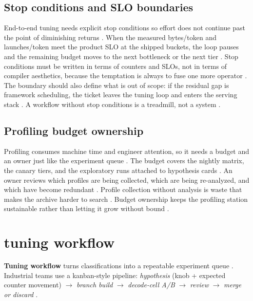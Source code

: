 \subsection{Stop conditions and SLO boundaries}

End-to-end tuning needs explicit stop conditions so effort does not continue past the point of diminishing returns \citep{chen2020compilerbasedhardw,memoryfloor2026,taxbreak2026}. When the measured bytes/token and launches/token meet the product SLO at the shipped buckets, the loop pauses and the remaining budget moves to the next bottleneck or the next tier \citep{patel2025llminference,memoryfloor2026}. Stop conditions must be written in terms of counters and SLOs, not in terms of compiler aesthetics, because the temptation is always to fuse one more operator \citep{chen2020compilerbasedhardw,taxbreak2026}. The boundary should also define what is out of scope: if the residual gap is framework scheduling, the ticket leaves the tuning loop and enters the serving stack \citep{kwon2023vllm,patel2025llminference}. A workflow without stop conditions is a treadmill, not a system \citep{memoryfloor2026,taxbreak2026}.

\subsection{Profiling budget ownership}

Profiling consumes machine time and engineer attention, so it needs a budget and an owner just like the experiment queue \citep{chen2020compilerbasedhardw,memoryfloor2026,patel2025llminference}. The budget covers the nightly matrix, the canary tiers, and the exploratory runs attached to hypothesis cards \citep{taxbreak2026,memoryfloor2026}. An owner reviews which profiles are being collected, which are being re-analyzed, and which have become redundant \citep{chen2020compilerbasedhardw,patel2025llminference}. Profile collection without analysis is waste that makes the archive harder to search \citep{memoryfloor2026,taxbreak2026}. Budget ownership keeps the profiling station sustainable rather than letting it grow without bound \citep{patel2025llminference,memoryfloor2026}.

\section{tuning workflow}
\label{sec:ch22_tuning_workflow}

\textbf{Tuning workflow} turns classifications into a repeatable experiment queue \citep{chen2020compilerbasedhardw,yirage2026,patel2025llminference,dlbook}. Industrial teams use a kanban-style pipeline: \emph{hypothesis} (knob + expected counter movement) $\rightarrow$ \emph{branch build} $\rightarrow$ \emph{decode-cell A/B} $\rightarrow$ \emph{review} $\rightarrow$ \emph{merge or discard} \citep{memoryfloor2026,taxbreak2026,kwon2023vllm}.

